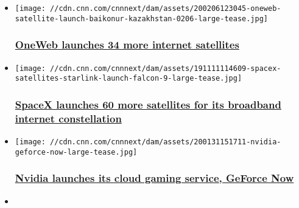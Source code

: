 \begin{itemize}
\item
  \href{/2020/02/06/tech/oneweb-satellite-internet-launch-scn/index.html}{}

  \texttt{[image: //cdn.cnn.com/cnnnext/dam/assets/200206123045-oneweb-satellite-launch-baikonur-kazakhstan-0206-large-tease.jpg]}

  \hypertarget{oneweb-launches-34-more-internet-satellites}{%
  \subsubsection{\texorpdfstring{\href{/2020/02/06/tech/oneweb-satellite-internet-launch-scn/index.html}{OneWeb
  launches 34 more internet
  satellites}}{OneWeb launches 34 more internet satellites}}\label{oneweb-launches-34-more-internet-satellites}}
\item
  \href{/2020/01/29/tech/spacex-starlink-satellite-internet-launch-scn/index.html}{}

  \texttt{[image: //cdn.cnn.com/cnnnext/dam/assets/191111114609-spacex-satellites-starlink-launch-falcon-9-large-tease.jpg]}

  \hypertarget{spacex-launches-60-more-satellites-for-its-broadband-internet-constellation}{%
  \subsubsection{\texorpdfstring{\href{/2020/01/29/tech/spacex-starlink-satellite-internet-launch-scn/index.html}{SpaceX
  launches 60 more satellites for its broadband internet
  constellation}}{SpaceX launches 60 more satellites for its broadband internet constellation}}\label{spacex-launches-60-more-satellites-for-its-broadband-internet-constellation}}
\item
  \href{/2020/02/04/tech/nvidia-geforce-now-launch/index.html}{}

  \texttt{[image: //cdn.cnn.com/cnnnext/dam/assets/200131151711-nvidia-geforce-now-large-tease.jpg]}

  \hypertarget{nvidia-launches-its-cloud-gaming-service-geforce-now-}{%
  \subsubsection{\texorpdfstring{\href{/2020/02/04/tech/nvidia-geforce-now-launch/index.html}{Nvidia
  launches its cloud gaming service, GeForce Now
  }}{Nvidia launches its cloud gaming service, GeForce Now }}\label{nvidia-launches-its-cloud-gaming-service-geforce-now-}}
\item
  \href{/2020/01/25/tech/byte-app-tiktok-vine/index.html}{}


\end{itemize}
